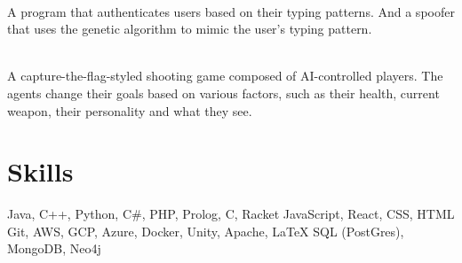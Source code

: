 \documentclass[]{resume-openfont}
\begin{document}
\\
A program that authenticates users based on their typing patterns. And a spoofer that uses the genetic algorithm to mimic the user's typing pattern.
\\
\sectionsep

\\
A capture-the-flag-styled shooting game composed of AI-controlled players. The agents change their goals based on various factors, such as their health, current weapon, their personality and what they see.\\
\sectionsep
  
%
%
\section{Skills}

\begin{resumeSkillList}
    \small{\item{
    Java, C++, Python, C\#, PHP, Prolog, C, Racket
    \hspace*{\fill} 
    JavaScript, React, CSS, HTML
    \\
    Git, AWS, GCP, Azure, Docker, Unity, Apache, \LaTeX
    \hspace*{\fill} 
    SQL (PostGres), MongoDB, Neo4j
    }}
\end{resumeSkillList}
\end{document}
